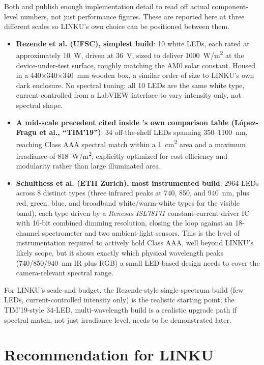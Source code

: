Both \cite{rezende2024lowcost} and \cite{schulthess2026classaaa} publish enough implementation detail to read off actual component-level numbers, not just performance figures. These are reported here at three different scales so LINKU's own choice can be positioned between them.

\begin{itemize}
    \item \textbf{Rezende et al. (UFSC), simplest build}: 10 white LEDs, each rated at approximately 10~W, driven at 36~V, sized to deliver 1000~W/m\textsuperscript{2} at the device-under-test surface, roughly matching the AM0 solar constant. Housed in a 440$\times$340$\times$340~mm wooden box, a similar order of size to LINKU's own dark enclosure. No spectral tuning: all 10 LEDs are the same white type, current-controlled from a LabVIEW interface to vary intensity only, not spectral shape.
    \item \textbf{A mid-scale precedent cited inside \cite{schulthess2026classaaa}'s own comparison table (L\'opez-Fragu et al., ``TIM'19'')}: 34 off-the-shelf LEDs spanning 350--1100~nm, reaching Class AAA spectral match within a 1~cm\textsuperscript{2} area and a maximum irradiance of 818~W/m\textsuperscript{2}, explicitly optimized for cost efficiency and modularity rather than large illuminated area.
    \item \textbf{Schulthess et al. (ETH Zurich), most instrumented build}: 2964 LEDs across 8 distinct types (three infrared peaks at 740, 850, and 940~nm, plus red, green, blue, and broadband white/warm-white types for the visible band), each type driven by a \textit{Renesas ISL78171} constant-current driver IC with 16-bit combined dimming resolution, closing the loop against an 18-channel spectrometer and two ambient-light sensors. This is the level of instrumentation required to actively hold Class AAA, well beyond LINKU's likely scope, but it shows exactly which physical wavelength peaks (740/850/940~nm IR plus RGB) a small LED-based design needs to cover the camera-relevant spectral range.
\end{itemize}

For LINKU's scale and budget, the Rezende-style single-spectrum build (few LEDs, current-controlled intensity only) is the realistic starting point; the TIM'19-style 34-LED, multi-wavelength build is a realistic upgrade path if spectral match, not just irradiance level, needs to be demonstrated later.

\section{Recommendation for LINKU}

